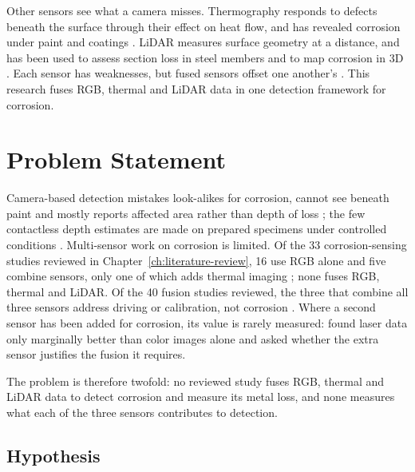 Other sensors see what a camera misses. Thermography responds to defects beneath
the surface through their effect on heat flow, and has revealed corrosion under
paint and coatings \citep{Elizalde2023,Lim2021,Doshvarpassand2022}. LiDAR measures
surface geometry at a distance, and has been used to assess section loss in steel
members \citep{Maru2025} and to map corrosion in 3D
\citep{PimenteldeFigueiredo2025}. Each sensor has weaknesses, but fused sensors
offset one another's \citep{Tran2024}. This research fuses RGB, thermal and LiDAR
data in one detection framework for corrosion.

\section{Problem Statement}
\label{sec:problem-statement}

Camera-based detection mistakes look-alikes for corrosion, cannot see beneath
paint and mostly reports affected area rather than depth of loss
\citep{Alvani2026,Savino2025}; the few contactless depth estimates are made on
prepared specimens under controlled conditions
\citep{Egodawela2025,Doshvarpassand2022,Haitz2022,Maru2025}. Multi-sensor work on
corrosion is limited. Of the 33 corrosion-sensing studies reviewed in
Chapter~\ref{ch:literature-review}, 16 use RGB alone and five combine sensors,
only one of which adds thermal imaging \citep{Lim2021}; none fuses RGB, thermal and
LiDAR. Of the 40 fusion studies reviewed, the three that combine all three sensors
address driving or calibration, not corrosion \citep{Tran2025,Tran2024,Yang2024}.
Where a second sensor has been added for corrosion, its value is rarely measured:
\citet{Haitz2022} found laser data only marginally better than color images alone
and asked whether the extra sensor justifies the fusion it requires.

The problem is therefore twofold: no reviewed study fuses RGB, thermal and LiDAR
data to detect corrosion and measure its metal loss, and none measures what each
of the three sensors contributes to detection.

\subsection*{Hypothesis}

